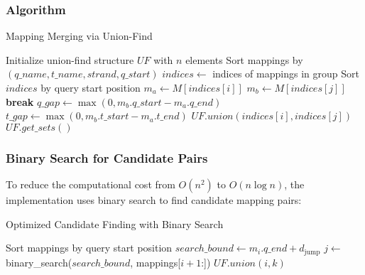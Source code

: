 \documentclass[11pt]{article}
\begin{document}
\subsubsection{Algorithm}

\begin{algorithm}
\caption{Mapping Merging via Union-Find}
\begin{algorithmic}[1]
\STATE Initialize union-find structure $UF$ with $n$ elements
\STATE Sort mappings by $(q\_name, t\_name, strand, q\_start)$
    \STATE $indices \gets$ indices of mappings in group
    \STATE Sort $indices$ by query start position
            \STATE $m_a \gets M[indices[i]]$
            \STATE $m_b \gets M[indices[j]]$
                \STATE \textbf{break} 
            \ENDIF
            \STATE $q\_gap \gets \max(0, m_b.q\_start - m_a.q\_end)$
            \STATE $t\_gap \gets \max(0, m_b.t\_start - m_a.t\_end)$
                \STATE $UF.union(indices[i], indices[j])$
            \ENDIF
        \ENDFOR
    \ENDFOR
\ENDFOR
\RETURN $UF.get\_sets()$
\end{algorithmic}
\end{algorithm}

\subsubsection{Binary Search for Candidate Pairs}

To reduce the computational cost from $O(n^2)$ to $O(n \log n)$, the implementation uses binary search to find candidate mapping pairs:

\begin{algorithm}
\caption{Optimized Candidate Finding with Binary Search}
\begin{algorithmic}[1]
\STATE Sort mappings by query start position
    \STATE $search\_bound \gets m_i.q\_end + d_{\text{jump}}$
    \STATE $j \gets$ binary\_search($search\_bound$, mappings[$i+1$:])
            \STATE $UF.union(i, k)$
        \ENDIF
    \ENDFOR
\ENDFOR
\end{algorithmic}
\end{algorithm}
\end{document}
